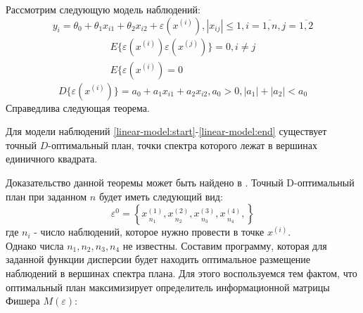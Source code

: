 	Рассмотрим следующую модель наблюдений:
	\begin{equation} \label{linear-model:start}
		y_i = \theta_0 + \theta_1 x_{i1} + \theta_2 x_{i2} + \varepsilon(x^{(i)}), |x_{i j}| \le 1, i = \overline{1, n}, j = \overline{1, 2}
	\end{equation}
	\begin{equation} \begin{split}
		E\{\varepsilon(x^{(i)}) \varepsilon(x^{(j)}) \} = 0, i \ne j \\
		E\{\varepsilon(x^{(i)}) = 0
	\end{split}\end{equation}
	\begin{equation}\label{linear-model:end}
		D\{ \varepsilon( x^{(i)} ) \} = a_0 + a_1 x_{i1} + a_2 x_{i2},
		a_0 > 0, |a_1| + |a_2| < a_0
	\end{equation}
	Справедлива следующая теорема.
	\begin{theorem}
		Для модели наблюдений \eqref{linear-model:start}-\eqref{linear-model:end} существует точный $D$-оптимальный план, точки спектра которого лежат в вершинах единичного квадрата.
	\end{theorem}
	Доказательство данной теоремы может быть найдено в \cite{kirlitsa2017}.
	Точный D-оптимальный план при заданном $n$ будет иметь следующий вид:
	\begin{equation}
		\varepsilon^{0} = \left \{ 
			\underset{n_1} {x^{(1)}},
			\underset{n_2} {x^{(2)}},
			\underset{n_3} {x^{(3)}},
			\underset{n_4} {x^{(4)}},
		\right \}
	\end{equation}
	где $n_i$ - число наблюдений, которое нужно провести в точке $x^{(i)}$.\\
	Однако числа $n_1, n_2, n_3, n_4$ не известны. Составим программу, которая для заданной функции дисперсии будет находить оптимальное размещение наблюдений в вершинах спектра плана.
	Для этого воспользуемся тем фактом, что оптимальный план максимизирует определитель информационной матрицы Фишера $M(\varepsilon)$:
